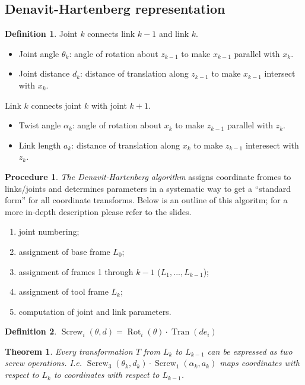 \documentclass{article}
\newtheorem{theorem}{Theorem}[section]
\theoremstyle{definition}
\newtheorem{definition}{Definition}[section]
\newtheorem{procedure}{Procedure}[section]
\DeclareMathOperator{\Tran}{Tran}
\DeclareMathOperator{\Rot}{Rot}
\DeclareMathOperator{\Screw}{Screw}
\begin{document}
\subsection{Denavit-Hartenberg representation}
\begin{definition}
Joint $k$ connects link $k-1$ and link $k$.
\begin{itemize}
\item Joint angle $\theta_k$: angle of rotation about $z_{k-1}$ to make $x_{k-1}$ parallel with $x_k$.
\item Joint distance $d_k$: distance of translation along $z_{k-1}$ to make $x_{k-1}$ intersect with $x_k$.
\end{itemize}
Link $k$ connects joint $k$ with joint $k+1$.
\begin{itemize}
\item Twist angle $\alpha_k$: angle of rotation about $x_k$ to make $z_{k-1}$ parallel with $z_k$.
\item Link length $a_k$: distance of translation along $x_k$ to make $z_{k-1}$ interesect with $z_k$.
\end{itemize}
\end{definition}

\begin{procedure}
\emph{The Denavit-Hartenberg algorithm} assigns coordinate fromes to links/joints and determines parameters in a systematic way to get a ``standard form'' for all coordinate transforms. Below is an outline of this algoritm; for a more in-depth description please refer to the slides.
\begin{enumerate}
\item joint numbering;
\item assignment of base frame $L_0$;
\item assignment of frames 1 through $k-1$ ($L_1, ..., L_{k-1}$);
\item assignment of tool frame $L_k$;
\item computation of joint and link parameters.
\end{enumerate}
\end{procedure}

\begin{definition}
$\Screw_i(\theta, d) = \Rot_i(\theta) \cdot \Tran(d e_i)$
\end{definition}

\begin{theorem}
Every transformation $T $ from $L_k$ to $L_{k-1}$ can be expressed as two screw operations. I.e. $\Screw_3(\theta_k, d_k) \cdot \Screw_1(\alpha_k, a_k)$ maps coordinates with respect to $L_k$ to coordinates with respect to $L_{k-1}$.
\end{theorem}
\end{document}
